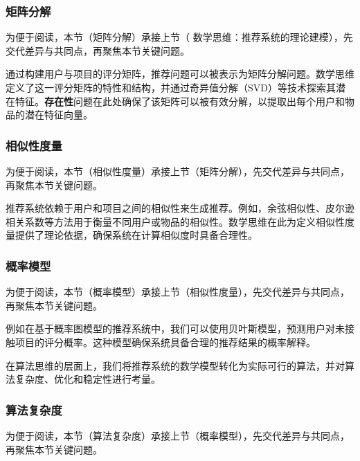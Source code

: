 \subsubsection*{矩阵分解}


为便于阅读，本节（矩阵分解）承接上节（ 数学思维：推荐系统的理论建模），先交代差异与共同点，再聚焦本节关键问题。

通过构建用户与项目的评分矩阵，推荐问题可以被表示为矩阵分解问题。数学思维定义了这一评分矩阵的特性和结构，并通过奇异值分解（SVD）等技术探索其潜在特征。{\bf 存在性}问题在此处确保了该矩阵可以被有效分解，以提取出每个用户和物品的潜在特征向量。
\subsubsection*{相似性度量}


为便于阅读，本节（相似性度量）承接上节（矩阵分解），先交代差异与共同点，再聚焦本节关键问题。

推荐系统依赖于用户和项目之间的相似性来生成推荐。例如，余弦相似性、皮尔逊相关系数等方法用于衡量不同用户或物品的相似性。数学思维在此为定义相似性度量提供了理论依据，确保系统在计算相似度时具备合理性。
\subsubsection*{概率模型}


为便于阅读，本节（概率模型）承接上节（相似性度量），先交代差异与共同点，再聚焦本节关键问题。

例如在基于概率图模型的推荐系统中，我们可以使用贝叶斯模型，预测用户对未接触项目的评分概率。这种模型确保系统具备合理的推荐结果的概率解释。

在算法思维的层面上，我们将推荐系统的数学模型转化为实际可行的算法，并对算法复杂度、优化和稳定性进行考量。
\subsubsection*{算法复杂度}


为便于阅读，本节（算法复杂度）承接上节（概率模型），先交代差异与共同点，再聚焦本节关键问题。


